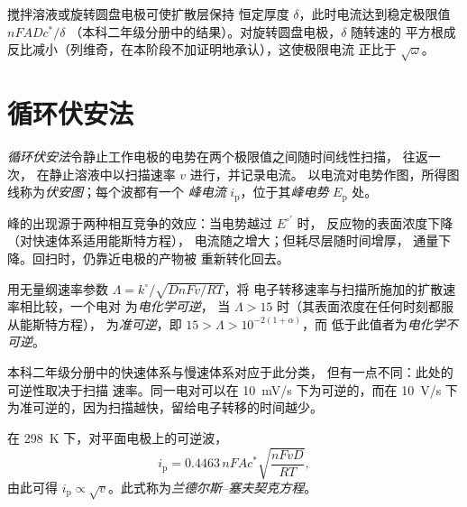 搅拌溶液或旋转圆盘电极可使扩散层保持
恒定厚度 $\delta$，此时电流达到稳定极限值 $nFADc^*/\delta$
（本科二年级分册中的结果）。对旋转圆盘电极，$\delta$ 随转速的
平方根成反比减小（列维奇，在本阶段不加证明地承认），这使极限电流
正比于 $\sqrt\omega$。

\section{循环伏安法}

\begin{definition}[循环伏安法]\label{def:b3:electrode-kinetics:cv}
\emph{循环伏安法}令静止工作电极的电势在两个极限值之间随时间线性扫描，
往返一次，
在静止溶液中以扫描速率 $v$ 进行，并记录电流。
以电流对电势作图，所得图线称为\emph{伏安图}；每个波都有一个
\emph{峰电流} $i_{\mathrm p}$，位于其\emph{峰电势}
$E_{\mathrm p}$ 处。
\end{definition}

峰的出现源于两种相互竞争的效应：当电势越过 $E^{\circ\prime}$ 时，
反应物的表面浓度下降（对快速体系适用能斯特方程），
电流随之增大；但耗尽层随时间增厚，
通量下降。回扫时，仍靠近电极的产物被
重新转化回去。

\begin{definition}[可逆性]\label{def:b3:electrode-kinetics:reversibility}
用无量纲速率参数 $\Lambda = k^\circ/\sqrt{DnFv/RT}$，将
电子转移速率与扫描所施加的扩散速率相比较，一个电对
为\emph{电化学可逆}，
当 $\Lambda > 15$ 时（其表面浓度在任何时刻都服从能斯特方程），
为\emph{准可逆}，即 $15 >
\Lambda > 10^{-2(1 + \alpha)}$，而
低于此值者为\emph{电化学不可逆}。
\end{definition}

\begin{remark}
本科二年级分册中的快速体系与慢速体系对应于此分类，
但有一点不同：此处的可逆性取决于扫描
速率。同一电对可以在 \qty{10}{mV/s} 下为可逆的，而在
\qty{10}{V/s} 下为准可逆的，因为扫描越快，留给电子转移的时间越少。
\end{remark}

\begin{proposition}\label{prop:b3:electrode-kinetics:randles-sevcik}
在 \qty{298}{K} 下，对平面电极上的可逆波，
\[
  i_{\mathrm p} = 0.4463\,nFAc^*\sqrt{\frac{nFvD}{RT}},
\]
由此可得 $i_{\mathrm p} \propto \sqrt v$。此式称为\emph{兰德尔斯–塞夫契克方程}。
\end{proposition}

